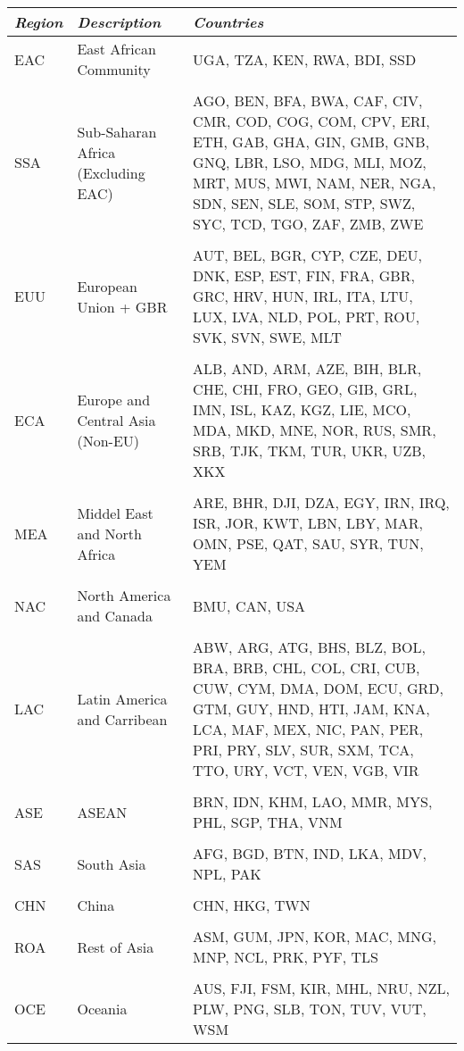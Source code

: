 \documentclass[a4paper]{article}
\begin{document}
\begin{table}[h!]
\label{tab:ctry}
\vspace{2mm}
\begin{tabular}{llp{6cm}} \toprule
\textit{Region} & \textit{Description} & \textit{Countries} \\ \midrule
EAC & East African Community & UGA, TZA, KEN, RWA, BDI, SSD \\ \\
SSA & Sub-Saharan Africa (Excluding EAC) & AGO, BEN, BFA, BWA, CAF, CIV, CMR, COD, COG, COM, CPV, ERI, ETH, GAB, GHA, GIN, GMB, GNB, GNQ, LBR, LSO, MDG, MLI, MOZ, MRT, MUS, MWI, NAM, NER, NGA, SDN, SEN, SLE, SOM, STP, SWZ, SYC, TCD, TGO, ZAF, ZMB, ZWE \\ \\
EUU & European Union + GBR & AUT, BEL, BGR, CYP, CZE, DEU, DNK, ESP, EST, FIN, FRA, GBR, GRC, HRV, HUN, IRL, ITA, LTU, LUX, LVA, NLD, POL, PRT, ROU, SVK, SVN, SWE, MLT \\ \\
ECA & Europe and Central Asia (Non-EU) & ALB, AND, ARM, AZE, BIH, BLR, CHE, CHI, FRO, GEO, GIB, GRL, IMN, ISL, KAZ, KGZ, LIE, MCO, MDA, MKD, MNE, NOR, RUS, SMR, SRB, TJK, TKM, TUR, UKR, UZB, XKX \\ \\
MEA & Middel East and North Africa & ARE, BHR, DJI, DZA, EGY, IRN, IRQ, ISR, JOR, KWT, LBN, LBY, MAR, OMN, PSE, QAT, SAU, SYR, TUN, YEM \\ \\
NAC & North America and Canada & BMU, CAN, USA \\ \\
LAC & Latin America and Carribean & ABW, ARG, ATG, BHS, BLZ, BOL, BRA, BRB, CHL, COL, CRI, CUB, CUW, CYM, DMA, DOM, ECU, GRD, GTM, GUY, HND, HTI, JAM, KNA, LCA, MAF, MEX, NIC, PAN, PER, PRI, PRY, SLV, SUR, SXM, TCA, TTO, URY, VCT, VEN, VGB, VIR \\ \\
ASE & ASEAN & BRN, IDN, KHM, LAO, MMR, MYS, PHL, SGP, THA, VNM \\ \\
SAS & South Asia & AFG, BGD, BTN, IND, LKA, MDV, NPL, PAK \\ \\
CHN & China & CHN, HKG, TWN \\ \\
ROA & Rest of Asia & ASM, GUM, JPN, KOR, MAC, MNG, MNP, NCL, PRK, PYF, TLS \\ \\
OCE & Oceania & AUS, FJI, FSM, KIR, MHL, NRU, NZL, PLW, PNG, SLB, TON, TUV, VUT, WSM
 \\ \bottomrule
\end{tabular}
\end{table}
\FloatBarrier
\end{document}
